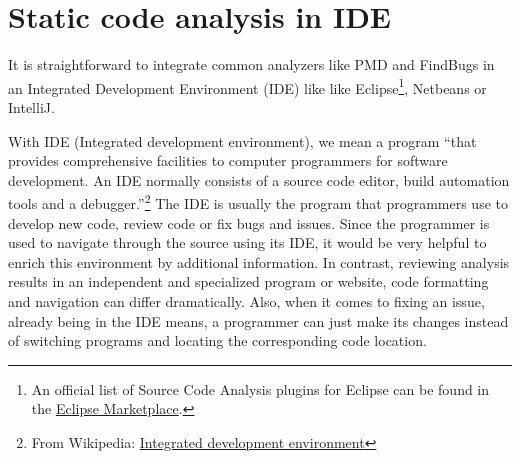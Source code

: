 \documentclass[conference]{IEEEtran}
\begin{document}



\section{Static code analysis in IDE}
\label{sec:static_code_analysis_ide}
It is straightforward to integrate common analyzers like PMD and FindBugs in an Integrated Development Environment (IDE) like like Eclipse\footnote{An official list of Source Code Analysis plugins for Eclipse can be found in the \href{http://marketplace.eclipse.org/taxonomy/term/14,31}{Eclipse Marketplace}.}, Netbeans or IntelliJ.

With IDE (Integrated development environment), we mean a program ``that provides comprehensive facilities to computer programmers for software development. An IDE normally consists of a source code editor, build automation tools and a debugger.''\footnote{From Wikipedia: \href{http://en.wikipedia.org/wiki/Integrated_development_environment}{Integrated development environment}}
The IDE is usually the program that programmers use to develop new code, review code or fix bugs and issues. Since the programmer is used to navigate through the source using its IDE, it would be very helpful to enrich this environment by additional information. In contrast, reviewing analysis results in an independent and specialized program or website, code formatting and navigation can differ dramatically. Also, when it comes to fixing an issue, already being in the IDE means, a programmer can just make its changes instead of switching programs and locating the corresponding code location.
\end{document}
